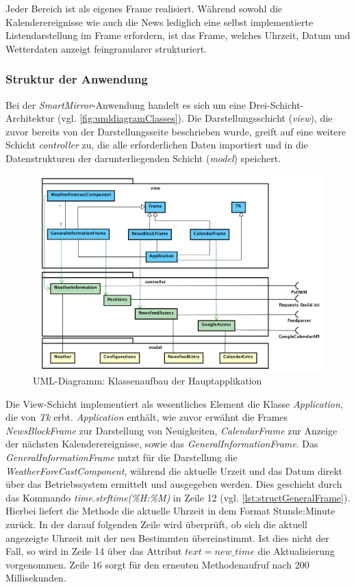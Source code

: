Jeder Bereich ist als eigenes Frame realisiert. Während sowohl die Kalenderereignisse wie auch die News lediglich eine selbst implementierte Listendarstellung im Frame erfordern, ist das Frame, welches Uhrzeit, Datum und Wetterdaten anzeigt feingranularer strukturiert.

 
\subsubsection*{Struktur der Anwendung}
\label{subsec:strukturAnwendung}
Bei der \textit{SmartMirror}-Anwendung handelt es sich um eine Drei-Schicht-Architektur (vgl. \autoref{fig:umldiagramClasses})\cite{sharan2015model}. Die Darstellungsschicht (\textit{view}), die zuvor bereits von der Darstellungsseite  beschrieben wurde, greift auf eine weitere Schicht \textit{controller} zu, die alle erforderlichen Daten importiert und in die Datenstrukturen der darunterliegenden Schicht (\textit{model}) speichert.

\begin{figure}
	\centering
	\includegraphics[width=0.8\linewidth]{bilder/umlDiagram_v3}
	\caption[UML-Diagramm: Klassenaufbau der Hauptapplikation]{UML-Diagramm: Klassenaufbau der Hauptapplikation}
	\label{fig:umldiagramClasses}
\end{figure}

Die View-Schicht implementiert als wesentliches Element die Klasse \textit{Application}, die von \textit{Tk} erbt. 
\textit{Application} enthält, wie zuvor erwähnt die Frames \textit{NewsBlockFrame} zur Darstellung von Neuigkeiten, \textit{CalendarFrame} zur Anzeige der nächsten Kalenderereignisse, sowie das \textit{GeneralInformationFrame}. Das \textit{GeneralInformationFrame} nutzt für die Darstellung die \textit{WeatherForeCastComponent}, während die aktuelle Urzeit und das Datum direkt über das Betriebssystem ermittelt und ausgegeben werden. Dies geschieht durch das Kommando \textit{time.strftime(\grq \%H:\%M\grq)} in Zeile 12 (vgl. \autoref{lst:structGeneralFrame}). Hierbei liefert die Methode die aktuelle Uhrzeit in dem Format Stunde:Minute zurück. In der darauf folgenden Zeile wird überprüft, ob sich die aktuell angezeigte Uhrzeit mit der neu Bestimmten übereinstimmt. Ist dies nicht der Fall, so wird in Zeile 14 über das Attribut \textit{$text=new\_ time$} die Aktualisierung vorgenommen.
Zeile 16 sorgt für den erneuten Methodenaufruf nach 200 Millisekunden.

